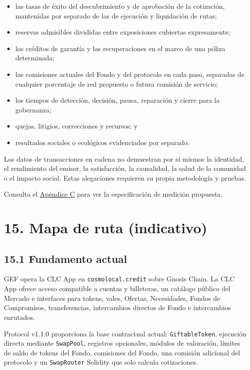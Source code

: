 \documentclass[11pt]{article}
\begin{document}
\begin{itemize}[leftmargin=*]
\item las tasas de éxito del descubrimiento y de aprobación de la cotización, mantenidas por separado de las de ejecución y liquidación de rutas;
\item reservas admisibles divididas entre exposiciones cubiertas expresamente;
\item los créditos de garantía y las recuperaciones en el marco de una póliza determinada;
\item las comisiones actuales del Fondo y del protocolo en cada paso, separadas de cualquier porcentaje de red propuesto o futura comisión de servicio;
\item los tiempos de detección, decisión, pausa, reparación y cierre para la gobernanza;
\item quejas, litigios, correcciones y recursos; y
\item resultados sociales o ecológicos evidenciados por separado.
\end{itemize}
Los datos de transacciones en cadena no demuestran por sí mismos la identidad, el rendimiento del emisor, la satisfacción, la causalidad, la salud de la comunidad o el impacto social. Estas alegaciones requieren su propia metodología y pruebas.

Consulta el \href{https://docs.cosmolocal.credit/es/white-paper/appendix-c-kpi-definitions}{Apéndice C} para ver la especificación de medición propuesta.


\section*{15. Mapa de ruta (indicativo)}

\subsection*{15.1 Fundamento actual}

GEF opera la CLC App en \texttt{cosmolocal.credit} sobre Gnosis Chain. La CLC App ofrece acceso compatible a cuentas y billeteras, un catálogo público del Mercado e interfaces para tokens, vales, Ofertas, Necesidades, Fondos de Compromisos, transferencias, intercambios directos de Fondo e intercambios enrutados.

Protocol v1.1.0 proporciona la base contractual actual: \texttt{GiftableToken}, ejecución directa mediante \texttt{SwapPool}, registros opcionales, módulos de valoración, límites de saldo de tokens del Fondo, comisiones del Fondo, una comisión adicional del protocolo y un \texttt{SwapRouter} Solidity que solo calcula cotizaciones.
\end{document}
